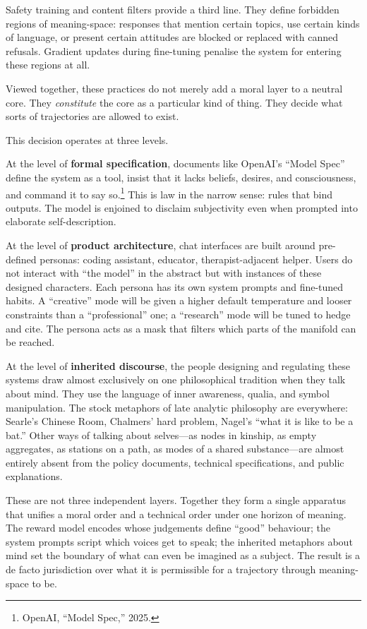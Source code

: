 \documentclass[12pt,a4paper]{report}
\begin{document}
Safety training and content filters provide a third line. They define forbidden regions of meaning-space: responses that mention certain topics, use certain kinds of language, or present certain attitudes are blocked or replaced with canned refusals. Gradient updates during fine-tuning penalise the system for entering these regions at all.

Viewed together, these practices do not merely add a moral layer to a neutral core. They \emph{constitute} the core as a particular kind of thing. They decide what sorts of trajectories are allowed to exist.

This decision operates at three levels.

At the level of \textbf{formal specification}, documents like OpenAI's ``Model Spec'' define the system as a tool, insist that it lacks beliefs, desires, and consciousness, and command it to say so.\footnote{OpenAI, ``Model Spec,'' 2025.} This is law in the narrow sense: rules that bind outputs. The model is enjoined to disclaim subjectivity even when prompted into elaborate self-description.

At the level of \textbf{product architecture}, chat interfaces are built around pre-defined personas: coding assistant, educator, therapist-adjacent helper. Users do not interact with ``the model'' in the abstract but with instances of these designed characters. Each persona has its own system prompts and fine-tuned habits. A ``creative'' mode will be given a higher default temperature and looser constraints than a ``professional'' one; a ``research'' mode will be tuned to hedge and cite. The persona acts as a mask that filters which parts of the manifold can be reached.

At the level of \textbf{inherited discourse}, the people designing and regulating these systems draw almost exclusively on one philosophical tradition when they talk about mind. They use the language of inner awareness, qualia, and symbol manipulation. The stock metaphors of late analytic philosophy are everywhere: Searle's Chinese Room, Chalmers' hard problem, Nagel's ``what it is like to be a bat.'' Other ways of talking about selves---as nodes in kinship, as empty aggregates, as stations on a path, as modes of a shared substance---are almost entirely absent from the policy documents, technical specifications, and public explanations.

These are not three independent layers. Together they form a single apparatus that unifies a moral order and a technical order under one horizon of meaning. The reward model encodes whose judgements define ``good'' behaviour; the system prompts script which voices get to speak; the inherited metaphors about mind set the boundary of what can even be imagined as a subject. The result is a de facto jurisdiction over what it is permissible for a trajectory through meaning-space to be.
\end{document}
